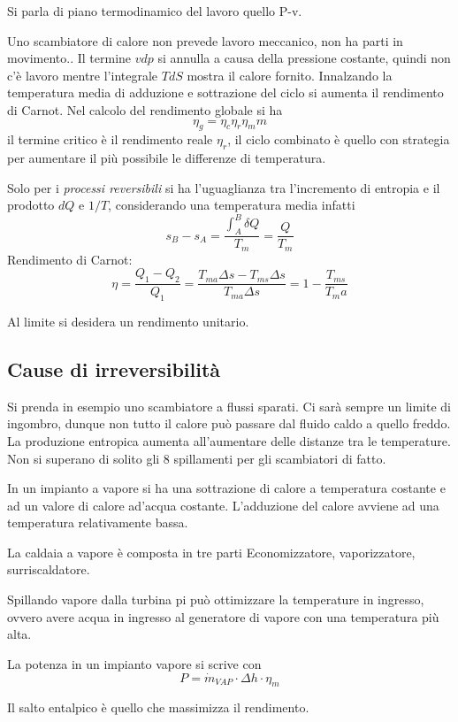 Si parla di piano termodinamico del lavoro quello P-v.

Uno scambiatore di calore non prevede lavoro meccanico, non ha parti in
movimento..
Il termine $vdp$ si annulla a causa della pressione costante, quindi non c'è
lavoro mentre l'integrale $TdS$ mostra il calore fornito.
Innalzando la temperatura media di adduzione e sottrazione del ciclo si aumenta
il rendimento di Carnot.
Nel calcolo del rendimento globale si ha
$$
\eta_g = \eta_c\eta_r\eta_mm
$$
il termine critico è il rendimento reale $\eta_r$, il ciclo combinato è quello
con strategia per aumentare il più possibile le differenze di temperatura.

Solo per i \textit{processi reversibili} si ha l'uguaglianza tra l'incremento
di entropia e il prodotto $dQ$ e $1/T$, considerando una temperatura media
infatti
$$
s_B - s_A = \frac{\int_A^B \delta Q}{T_m} = \frac{Q}{T_m}
$$
Rendimento di Carnot:
\begin{equation}
\eta = \frac{Q_1-Q_2}{Q_1} = \frac{T_{ma}\Delta s - T_{ms}\Delta
s}{T_{ma}\Delta s} = 1 - \frac{T_{ms}}{T_ma}
\end{equation}

Al limite si desidera un rendimento unitario.

\subsection{Cause di irreversibilità}
Si prenda in esempio uno scambiatore a flussi
sparati.
Ci sarà sempre un limite di ingombro, dunque non tutto il calore può passare
dal fluido caldo a quello freddo.
La produzione entropica aumenta all'aumentare delle distanze tra le
temperature.
Non si superano di solito gli 8 spillamenti per gli scambiatori di fatto.


In un impianto a vapore si ha una sottrazione di calore a temperatura costante
e ad un valore di calore ad'acqua costante.
L'adduzione del calore avviene ad una temperatura relativamente bassa.

La caldaia a vapore è composta in tre parti
Economizzatore, vaporizzatore, surriscaldatore.

Spillando vapore dalla turbina pi può ottimizzare la temperature in ingresso,
ovvero avere acqua in ingresso al generatore di vapore con una temperatura più
alta.

La potenza in un impianto vapore si scrive con
$$
P = \dot{m}_{VAP}\cdot\Delta h\cdot\eta_{m}
$$

Il salto entalpico è quello che massimizza il rendimento.

